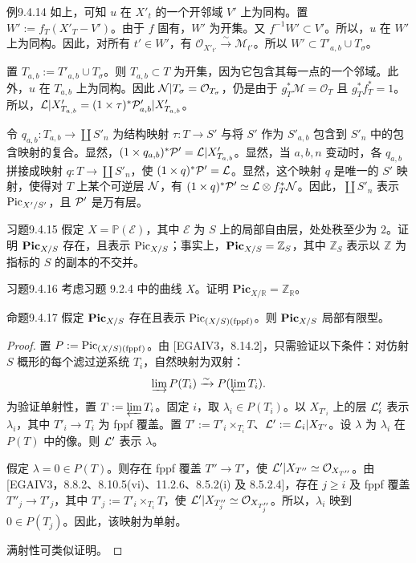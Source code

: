 \begin{origstatement}{例}{9.4.14}
如上，可知 $u$ 在 $X'_t$ 的一个开邻域 $V'$ 上为同构。置 $W':=f_T(X'_T-V')$。由于 $f$ 固有，$W'$ 为开集。又 $f^{-1}W'\subset V'$。所以，$u$ 在 $W'$ 上为同构。因此，对所有 $t'\in W'$，有 $\mathcal O_{X'_{t'}}\xrightarrow{\sim}\mathcal M_{t'}$。所以 $W'\subset T'_{a,b}\cup T_\sigma$。

置 $T_{a,b}:=T'_{a,b}\cup T_\sigma$。则 $T_{a,b}\subset T$ 为开集，因为它包含其每一点的一个邻域。此外，$u$ 在 $T_{a,b}$ 上为同构。因此 $\mathcal N|T_\sigma=\mathcal O_{T_\sigma}$，仍是由于 $g_T^*\mathcal M=\mathcal O_T$ 且 $g_T^*f_T^*=1$。所以，$\mathcal L|X'_{T_{a,b}}=(1\times\tau)^*\mathcal P'_{a,b}|X'_{T_{a,b}}$。

令 $q_{a,b}:T_{a,b}\to\coprod S'_n$ 为结构映射 $\tau:T\to S'$ 与将 $S'$ 作为 $S'_{a,b}$ 包含到 $S'_n$ 中的包含映射的复合。显然，$(1\times q_{a,b})^*\mathcal P'=\mathcal L|X'_{T_{a,b}}$。显然，当 $a,b,n$ 变动时，各 $q_{a,b}$ 拼接成映射 $q:T\to\coprod S'_n$，使 $(1\times q)^*\mathcal P'=\mathcal L$。显然，这个映射 $q$ 是唯一的 $S'$ 映射，使得对 $T$ 上某个可逆层 $\mathcal N$，有 $(1\times q)^*\mathcal P'\simeq\mathcal L\otimes f_T^*\mathcal N$。因此，$\coprod S'_n$ 表示 $\operatorname{Pic}_{X'/S'}$，且 $\mathcal P'$ 是万有层。
\end{origstatement}
\begin{origstatement}{习题}{9.4.15}\label{ch09s04:9.4.15}
假定 $X=\mathbb P(\mathcal E)$，其中 $\mathcal E$ 为 $S$ 上的局部自由层，处处秩至少为 $2$。证明 $\mathbf{Pic}_{X/S}$ 存在，且表示 $\operatorname{Pic}_{X/S}$；事实上，$\mathbf{Pic}_{X/S}=\mathbb Z_S$，其中 $\mathbb Z_S$ 表示以 $\mathbb Z$ 为指标的 $S$ 的副本的不交并。
\end{origstatement}
\begin{origstatement}{习题}{9.4.16}\label{ch09s04:9.4.16}
考虑习题 9.2.4 中的曲线 $X$。证明 $\mathbf{Pic}_{X/\mathbb R}=\mathbb Z_{\mathbb R}$。
\end{origstatement}
\begin{origstatement}{命题}{9.4.17}\label{ch09s04:9.4.17}
假定 $\mathbf{Pic}_{X/S}$ 存在且表示 $\operatorname{Pic}_{(X/S)(\mathrm{fppf})}$。则 $\mathbf{Pic}_{X/S}$ 局部有限型。
\end{origstatement}
\begin{proof}
置 $P:=\operatorname{Pic}_{(X/S)(\mathrm{fppf})}$。由 [EGAIV3，8.14.2]，只需验证以下条件：对仿射 $S$ 概形的每个滤过逆系统 $T_i$，自然映射为双射：
\[
\varinjlim P(T_i)\xrightarrow{\sim}P(\varprojlim T_i).
\]
为验证单射性，置 $T:=\varprojlim T_i$。固定 $i$，取 $\lambda_i\in P(T_i)$。以 $X_{T'_i}$ 上的层 $\mathcal L'_i$ 表示 $\lambda_i$，其中 $T'_i\to T_i$ 为 fppf 覆盖。置 $T':=T'_i\times_{T_i}T$、$\mathcal L':=\mathcal L_i|X_{T'}$。设 $\lambda$ 为 $\lambda_i$ 在 $P(T)$ 中的像。则 $\mathcal L'$ 表示 $\lambda$。

假定 $\lambda=0\in P(T)$。则存在 fppf 覆盖 $T''\to T'$，使 $\mathcal L'|X_{T''}\simeq\mathcal O_{X_{T''}}$。由 [EGAIV3，8.8.2、8.10.5(vi)、11.2.6、8.5.2(i) 及 8.5.2.4]，存在 $j\geq i$ 及 fppf 覆盖 $T''_j\to T'_j$，其中 $T'_j:=T'_i\times_{T_i}T$，使 $\mathcal L'|X_{T''_j}\simeq\mathcal O_{X_{T''_j}}$。所以，$\lambda_i$ 映到 $0\in P(T_j)$。因此，该映射为单射。

满射性可类似证明。
\end{proof}
